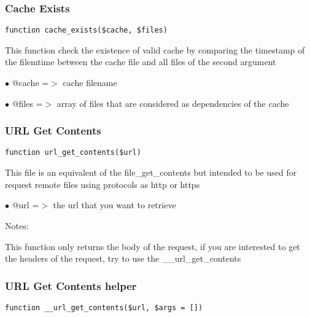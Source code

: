 \documentclass[a4paper]{article}
\begin{document}
\subsubsection{Cache Exists}

\begin{lstlisting}
function cache_exists($cache, $files)
\end{lstlisting}

This function check the existence of valid cache by comparing the timestamp
of the filemtime between the cache file and all files of the second argument

\begin{compactitem}
\item[\color{myblue}$\bullet$] @cache =$>$ cache filename
\item[\color{myblue}$\bullet$] @files =$>$ array of files that are considered as dependencies of the cache
\end{compactitem}

\hypertarget{toc132}{}
\subsubsection{URL Get Contents}

\begin{lstlisting}
function url_get_contents($url)
\end{lstlisting}

This file is an equivalent of the file\_get\_contents but intended to be used
for request remote files using protocols as http or https

\begin{compactitem}
\item[\color{myblue}$\bullet$] @url =$>$ the url that you want to retrieve
\end{compactitem}

Notes:

This function only returns the body of the request, if you are interested
to get the headers of the request, try to use the \_\_url\_get\_contents

\hypertarget{toc133}{}
\subsubsection{URL Get Contents helper}

\begin{lstlisting}
function __url_get_contents($url, $args = [])
\end{lstlisting}
\end{document}

